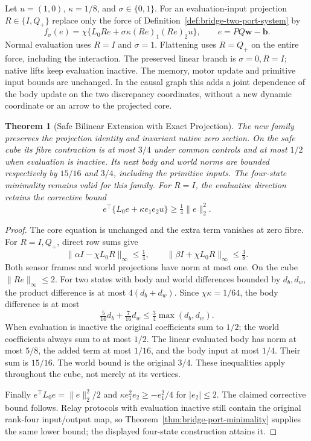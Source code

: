 \documentclass[11pt,a4paper]{article}
\newtheorem{theorem}{Theorem}[section]
\theoremstyle{definition}
\begin{document}
Let $u=(1,0)$, $\kappa=1/8$, and $\sigma\in\{0,1\}$. For an evaluation-input projection $R\in\{I,Q_+\}$ replace only the force of Definition~\ref{def:bridge-two-port-system} by
\[
 f_\sigma(e)=\chi\{L_0Re+\sigma\kappa (Re)_1(Re)_2u\},
 \qquad e=P Q\mathbf w-\mathbf b.
\]
Normal evaluation uses $R=I$ and $\sigma=1$. Flattening uses $R=Q_+$ on the entire force, including the interaction. The preserved linear branch is $\sigma=0,R=I$; native lifts keep evaluation inactive. The memory, motor update and primitive input bounds are unchanged. In the causal graph this adds a joint dependence of the body update on the two discrepancy coordinates, without a new dynamic coordinate or an arrow to the projected core.

\begin{theorem}[Safe Bilinear Extension with Exact Projection]\label{thm:bridge-bilinear-safe-extension}
The new family preserves the projection identity and invariant native zero section. On the safe cube its fibre contraction is at most $3/4$ under common controls and at most $1/2$ when evaluation is inactive. Its next body and world norms are bounded respectively by $15/16$ and $3/4$, including the primitive inputs. The four-state minimality remains valid for this family. For $R=I$, the evaluative direction retains the corrective bound
\[
 e^\top\{L_0e+\kappa e_1e_2u\}\ge\tfrac14\|e\|_2^2.
\]
\end{theorem}
\begin{proof}
The core equation is unchanged and the extra term vanishes at zero fibre. For $R=I,Q_+$, direct row sums give
\[
 \|\alpha I-\chi L_0R\|_\infty\le\tfrac14,\qquad
 \|\beta I+\chi L_0R\|_\infty\le\tfrac38.
\]
Both sensor frames and world projections have norm at most one. On the cube $\|Re\|_\infty\le2$. For two states with body and world differences bounded by $d_b,d_w$, the product difference is at most $4(d_b+d_w)$. Since $\chi\kappa=1/64$, the body difference is at most
\[
 \tfrac5{16}d_b+\tfrac7{16}d_w\le\tfrac34\max(d_b,d_w).
\]
When evaluation is inactive the original coefficients sum to $1/2$; the world coefficients always sum to at most $1/2$. The linear evaluated body has norm at most $5/8$, the added term at most $1/16$, and the body input at most $1/4$. Their sum is $15/16$. The world bound is the original $3/4$. These inequalities apply throughout the cube, not merely at its vertices.

Finally $e^\top L_0e=\|e\|_2^2/2$ and $\kappa e_1^2e_2\ge-e_1^2/4$ for $|e_2|\le2$. The claimed corrective bound follows. Relay protocols with evaluation inactive still contain the original rank-four input/output map, so Theorem~\ref{thm:bridge-port-minimality} supplies the same lower bound; the displayed four-state construction attains it.
\end{proof}
\end{document}
